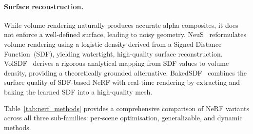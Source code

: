 \paragraph{Surface reconstruction.}
While volume rendering naturally produces accurate alpha composites, it does not
enforce a well-defined surface, leading to noisy geometry.
NeuS~\citep{wang2021neus} reformulates volume rendering using a logistic
density derived from a Signed Distance Function~(SDF), yielding watertight,
high-quality surface reconstruction.
VolSDF~\citep{yariv2021volsdf} derives a rigorous analytical mapping from
SDF values to volume density, providing a theoretically grounded alternative.
BakedSDF~\citep{yariv2023bakedsdf} combines the surface quality of SDF-based
NeRF with real-time rendering by extracting and baking the learned SDF into a
high-quality mesh.

Table~\ref{tab:nerf_methods} provides a comprehensive comparison of NeRF variants
across all three sub-families: per-scene optimisation, generalizable,
and dynamic methods.

